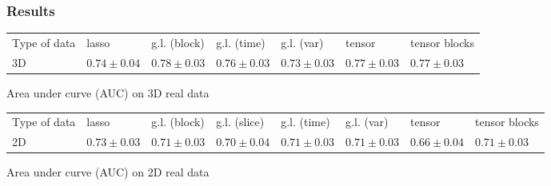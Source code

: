 \documentclass{beamer}
\begin{document}
\begin{frame}
    \frametitle{Results}
    \begin{table}[H]
        \centering
        \label{tab:result_real}
        \renewcommand{\arraystretch}{1.2} 
        \begin{adjustbox}{center}
        \begin{tabular}{|>{\centering\arraybackslash}m{1.4cm}|>{\centering\arraybackslash}m{1.1cm}|>{\centering\arraybackslash}m{1.1cm}|>{\centering\arraybackslash}m{1.1cm}|>{\centering\arraybackslash}m{1.1cm}|>{\centering\arraybackslash}m{1.1cm}|>{\centering\arraybackslash}m{1.1cm}|}
            \cline{1-7}
            Type of data & lasso & g.l. (block) & g.l. (time)& g.l. (var) & tensor & tensor blocks\\
            \cline{1-7} 
            3D & $0.74 \pm 0.04$& $0.78 \pm 0.03$ & $0.76 \pm 0.03$ & $0.73 \pm 0.03$ & $0.77 \pm 0.03$ & $0.77 \pm 0.03$ \\
            \cline{1-7}
    
        \end{tabular}
        
    \end{adjustbox}
    \parbox{0.9\textwidth}{
    \vspace{0.2 cm}    
    \centering \small Area under curve (AUC) on 3D real data}
    \vspace{0.3 cm}
    
    \begin{adjustbox}{center}
    \begin{tabular}{|>{\centering\arraybackslash}m{1.2cm}|>{\centering\arraybackslash}m{1cm}|>{\centering\arraybackslash}m{1cm}|>{\centering\arraybackslash}m{1cm}|>{\centering\arraybackslash}m{1cm}|>{\centering\arraybackslash}m{1cm}|>{\centering\arraybackslash}m{1cm}|>{\centering\arraybackslash}m{1cm}|}
        \cline{1-8}
        Type of data & lasso & g.l. (block) & g.l. (slice)& g.l. (time)& g.l. (var) & tensor & tensor blocks\\
        \cline{1-8} 
        2D & $0.73 \pm 0.03$ & $0.71 \pm 0.03$ & $0.70 \pm 0.04$ & $0.71 \pm 0.03 $  & $0.71 \pm 0.03$ & $0.66 \pm 0.04$ & $0.71 \pm 0.03$ \\
        \cline{1-8}
    \end{tabular}
    \end{adjustbox}
    \parbox{0.9\textwidth}{
    \vspace{0.2 cm}    
    \centering \small Area under curve (AUC) on 2D real data}
    \end{table}
\end{frame}
\end{document}
